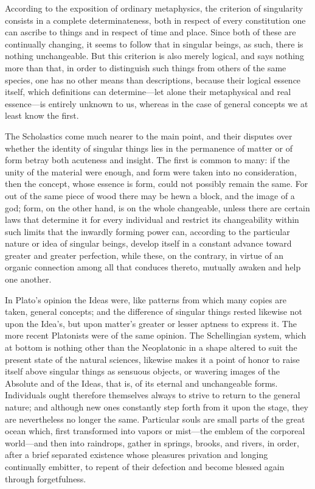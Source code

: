 \documentclass[12pt,a4paper]{article}
\begin{document}
According to the exposition of ordinary metaphysics, the criterion of
singularity consists in a complete determinateness, both in respect of every
constitution one can ascribe to things and in respect of time and place. Since
both of these are continually changing, it seems to follow that in singular
beings, as such, there is nothing unchangeable. But this criterion is also
merely logical, and says nothing more than that, in order to distinguish such
things from others of the same species, one has no other means than
descriptions, because their logical essence itself, which definitions can
determine---let alone their metaphysical and real essence---is entirely unknown
to us, whereas in the case of general concepts we at least know the first.

The Scholastics come much nearer to the main point, and their disputes over
whether the identity of singular things lies in the permanence of matter or of
form betray both acuteness and insight. The first is common to many: if the
unity of the material were enough, and form were taken into no consideration,
then the concept, whose essence is form, could not possibly remain the same. For
out of the same piece of wood there may be hewn a block, and the image of a god;
form, on the other hand, is on the whole changeable, unless there are certain
laws that determine it for every individual and restrict its changeability
within such limits that the inwardly forming power can, according to the
particular nature or
idea of singular beings, develop itself in a constant advance toward greater and
greater perfection, while these, on the contrary, in virtue of an organic
connection among all that conduces thereto, mutually awaken and help one
another.

In Plato's opinion the Ideas were, like patterns from which many copies are
taken, general concepts; and the difference of singular things rested likewise
not upon the Idea's, but upon matter's greater or lesser aptness to express it.
The more recent Platonists were of the same opinion. The Schellingian system,
which at bottom is nothing other than the Neoplatonic in a shape altered to suit
the present state of the natural sciences, likewise makes it a point of honor to
raise itself above singular things as sensuous objects, or wavering images of
the Absolute and of the Ideas, that is, of its eternal and unchangeable forms.
Individuals ought therefore themselves always to strive to return to the general
nature; and although new ones constantly step forth from it upon the stage, they
are nevertheless no longer the same. Particular souls are small parts of the
great ocean which, first transformed into vapors or mist---the emblem of the
corporeal world---and then into raindrops, gather in springs, brooks, and
rivers, in order, after a brief separated existence whose pleasures privation
and longing continually embitter, to repent of their defection and become
blessed again through forgetfulness.
\end{document}
